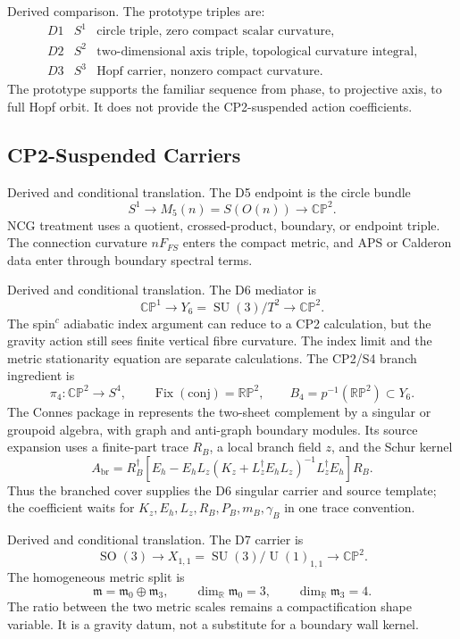 \documentclass[11pt]{article}
\newcommand{\CP}{\mathbb{CP}}
\newcommand{\RP}{\mathbb{RP}}
\newcommand{\RR}{\mathbb{R}}
\newcommand{\mzero}{\mathfrak m_0}
\newcommand{\mthree}{\mathfrak m_3}
\newcommand{\SU}{\operatorname{SU}}
\newcommand{\U}{\operatorname{U}}
\newcommand{\SO}{\operatorname{SO}}
\begin{document}
Derived comparison.  The prototype triples are:
\[
\begin{array}{lll}
D1 & S^1 & \text{circle triple, zero compact scalar curvature},\\
D2 & S^2 & \text{two-dimensional axis triple, topological curvature integral},\\
D3 & S^3 & \text{Hopf carrier, nonzero compact curvature}.
\end{array}
\]
The prototype supports the familiar sequence from phase, to projective
axis, to full Hopf orbit.  It does not provide the CP2-suspended action
coefficients.

\subsection{CP2-Suspended Carriers}

Derived and conditional translation.  The D5 endpoint is the circle bundle
\[
  S^1\longrightarrow M_5(n)=S(O(n))\longrightarrow \CP^2.
\]
NCG treatment uses a quotient, crossed-product, boundary, or endpoint
triple.  The connection curvature \(nF_{FS}\) enters the compact metric,
and APS or Calderon data enter through boundary spectral terms.

Derived and conditional translation.  The D6 mediator is
\[
  \CP^1\longrightarrow Y_6=\SU(3)/T^2\longrightarrow \CP^2.
\]
The spin\(^c\) adiabatic index argument can reduce to a CP2 calculation,
but the gravity action still sees finite vertical fibre curvature.  The
index limit and the metric stationarity equation are separate calculations.
The CP2/S4 branch ingredient is
\[
  \pi_4:\CP^2\longrightarrow S^4,\qquad
  \operatorname{Fix}(\mathrm{conj})=\RP^2,\qquad
  B_4=p^{-1}(\RP^2)\subset Y_6 .
\]
The Connes package in \cite{ncg-cp2-s4-branch} represents the two-sheet
complement by a singular or groupoid algebra, with graph and anti-graph
boundary modules.  Its source expansion uses a finite-part trace \(R_B\), a
local branch field \(z\), and the Schur kernel
\[
  A_{\mathrm{br}}
  =
  R_B^\dagger\!\left[
      E_h
      -E_hL_z(K_z+L_z^\dagger E_hL_z)^{-1}L_z^\dagger E_h
    \right]R_B .
\]
Thus the branched cover supplies the D6 singular carrier and source template;
the coefficient waits for \(K_z,E_h,L_z,R_B,P_B,m_B,\gamma_B\) in one trace
convention.

Derived and conditional translation.  The D7 carrier is
\[
  \SO(3)\longrightarrow X_{1,1}=\SU(3)/\U(1)_{1,1}
  \longrightarrow \CP^2.
\]
The homogeneous metric split is
\[
  \mathfrak m=\mzero\oplus\mthree,\qquad
  \dim_{\RR}\mzero=3,\qquad \dim_{\RR}\mthree=4.
\]
The ratio between the two metric scales remains a compactification shape
variable.  It is a gravity datum, not a substitute for a boundary wall
kernel.
\end{document}
